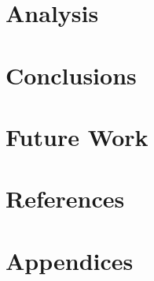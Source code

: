 \documentclass[runningheads]{llncs}
\begin{document}
\section{Analysis} 
%
%  
%
%
%  
%
%
%  
%
%
%  
%
%
%  
%
%
%  
%
\section{Conclusions} 
%
%  
%

\section{Future Work}

\section{References}

\section{Appendices}  
\end{document}
